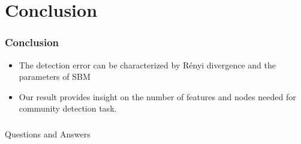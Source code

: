 \documentclass{beamer}
\begin{document}
\section{Conclusion}
\begin{frame}
\frametitle{Conclusion}
\begin{itemize}
\item The detection error can be
characterized by Rényi divergence and the parameters of SBM
\item Our result provides insight on the
number of features and nodes needed for community
detection task.
\end{itemize}
\end{frame}

\begin{frame}
\frametitle{}
\begin{block}{}
\centering
{\Huge Questions and Answers}
\end{block}
\end{frame}
\end{document}
